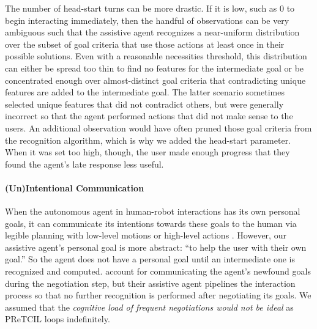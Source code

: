 \documentclass[letterpaper]{article} %
\begin{document}
The number of head-start turns can be more drastic.  If it is low, such as $0$ to begin interacting immediately, then the handful of observations can be very ambiguous such that the assistive agent recognizes a near-uniform distribution over the subset of goal criteria that use those actions at least once in their possible solutions.  Even with a reasonable necessities threshold, this distribution can either be spread too thin to find no features for the intermediate goal or be concentrated enough over almost-distinct goal criteria that contradicting unique features are added to the intermediate goal.  The latter scenario sometimes selected unique features that did not contradict others, but were generally incorrect so that the agent performed actions that did not make sense to the users.  An additional observation would have often pruned those goal criteria from the recognition algorithm, which is why we added the head-start parameter.  When it was set too high, though, the user made enough progress that they found the agent's late response less useful. %



\vspace{-12pt}
\paragraph{(Un)Intentional Communication} When the autonomous agent in human-robot interactions has its own personal goals, it can communicate its intentions towards these goals to the human via legible planning with low-level motions \cite{Dragan-2013-7732} or high-level actions \cite{DBLP:conf/aaai/KulkarniSK19}.  However, our assistive agent's personal goal is more abstract: ``to help the user with their own goal.''  So the agent does not have a personal goal until an intermediate one is recognized and computed.  \citeauthor{geibPetrick_2016}  account for communicating the agent's newfound goals during the negotiation step, but their assistive agent pipelines the interaction process so that no further recognition is performed after negotiating its goals. %
 We assumed that the \textit{cognitive load of frequent negotiations would not be ideal} as {\sc PReTCIL} loops indefinitely.
\end{document}
